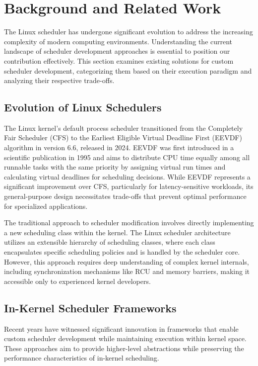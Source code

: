 
\section{Background and Related Work}

The Linux scheduler has undergone significant evolution to address the increasing complexity of modern computing environments. Understanding the current landscape of scheduler development approaches is essential to position our contribution effectively. This section examines existing solutions for custom scheduler development, categorizing them based on their execution paradigm and analyzing their respective trade-offs.

\subsection{Evolution of Linux Schedulers}

The Linux kernel's default process scheduler transitioned from the Completely Fair Scheduler (CFS) to the Earliest Eligible Virtual Deadline First (EEVDF) algorithm in version 6.6, released in 2024. EEVDF was first introduced in a scientific publication in 1995 and aims to distribute CPU time equally among all runnable tasks with the same priority by assigning virtual run times and calculating virtual deadlines for scheduling decisions. While EEVDF represents a significant improvement over CFS, particularly for latency-sensitive workloads, its general-purpose design necessitates trade-offs that prevent optimal performance for specialized applications.

\parspace
The traditional approach to scheduler modification involves directly implementing a new scheduling class within the kernel. The Linux scheduler architecture utilizes an extensible hierarchy of scheduling classes, where each class encapsulates specific scheduling policies and is handled by the scheduler core. However, this approach requires deep understanding of complex kernel internals, including synchronization mechanisms like RCU and memory barriers, making it accessible only to experienced kernel developers.

\subsection{In-Kernel Scheduler Frameworks}

Recent years have witnessed significant innovation in frameworks that enable custom scheduler development while maintaining execution within kernel space. These approaches aim to provide higher-level abstractions while preserving the performance characteristics of in-kernel scheduling.


